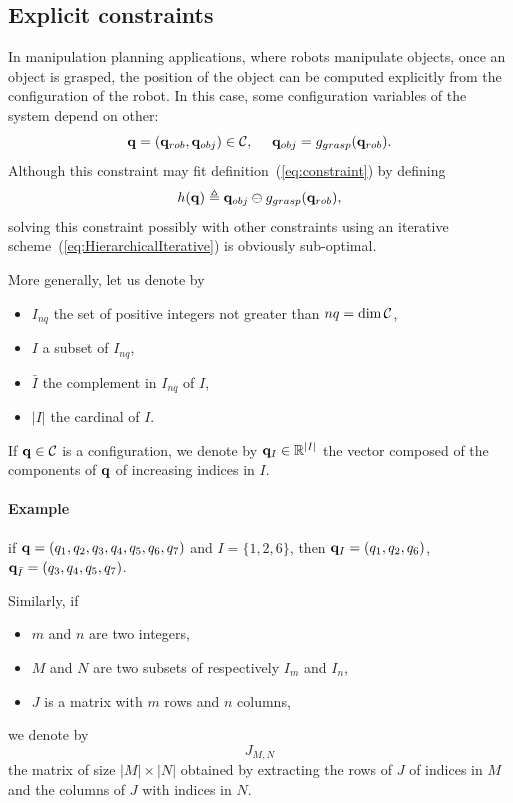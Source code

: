 \subsection{Explicit constraints}

In manipulation planning applications, where robots manipulate objects, once an object is grasped, the position of the object can be computed explicitly from the configuration of the robot. In this case, some configuration variables of the system depend on other:
$$
\conf=(\conf_{rob},\conf_{obj})\in\CS,\ \ \ \ \conf_{obj} = g_{grasp}(\conf_{rob}).
$$
Although this constraint may fit definition~(\ref{eq:constraint}) by defining
\begin{equation}\label{eq:explicit-grasp}
h(\conf) \triangleq \conf_{obj} \ominus g_{grasp}(\conf_{rob}),
\end{equation}
solving this constraint possibly with other constraints using an iterative scheme~(\ref{eq:HierarchicalIterative}) is obviously sub-optimal.

More generally, let us denote by
\begin {itemize}
\item $I_{nq}$ the set of positive integers not greater than $nq=\dim\mathcal{C}$,
\item $I$ a subset of $I_{nq}$,
\item $\bar{I}$ the complement in $I_{nq}$ of $I$,
\item $|I|$ the cardinal of $I$.
\end {itemize}
If $\mathbf{q}\in\mathcal{C}$ is a configuration, we denote by $\mathbf{q}_{I}\in\mathbb{R}^{|I|}$ the vector composed of the components of $\mathbf{q}$ of increasing indices in $I$.
\paragraph {Example} if $\mathbf{q} = (q_1,q_2,q_3,q_4,q_5,q_6,q_7)$ and $I=\{1,2,6\}$, then $\mathbf{q}_I=(q_1,q_2,q_6)$, $\mathbf{q}_{\bar{I}}=(q_3,q_4,q_5,q_7)$.

Similarly, if
\begin{itemize}
\item $m$ and $n$ are two integers,
\item $M$ and $N$ are two subsets of respectively $I_{m}$ and $I_{n}$,
\item $J$ is a matrix with $m$ rows and $n$ columns,
\end{itemize}
we denote by
\begin{equation}\label{eq:sub-matrix}
  J_{M,N}
\end{equation}
the matrix of size $|M| \times |N|$ obtained by extracting the rows of $J$ of indices in $M$ and the columns of $J$ with indices in $N$.

